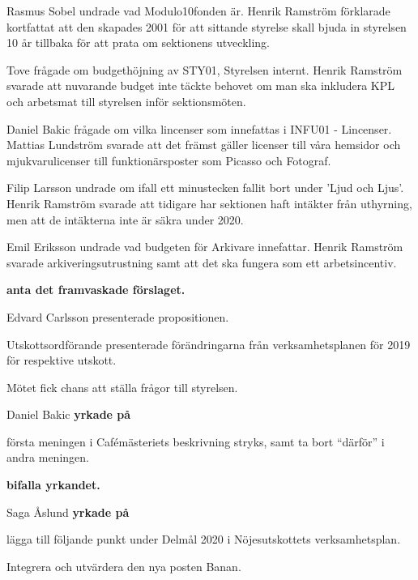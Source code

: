 \documentclass[10pt]{article}
\begin{document}
\begin{paragrafer}
\begin{paragrafer}
      Rasmus Sobel undrade vad Modulo10fonden är. Henrik Ramström förklarade kortfattat att den skapades 2001 för att sittande styrelse skall bjuda in styrelsen 10 år tillbaka för att prata om sektionens utveckling. 


      Tove frågade om budgethöjning av STY01, Styrelsen internt. Henrik Ramström svarade att nuvarande budget inte täckte behovet om man ska inkludera KPL och arbetsmat till styrelsen inför sektionsmöten. 

      Daniel Bakic frågade om vilka lincenser som innefattas i INFU01 - Lincenser. Mattias Lundström svarade att det främst gäller licenser till våra hemsidor och mjukvarulicenser till funktionärsposter som Picasso och Fotograf. 
      
      Filip Larsson undrade om ifall ett minustecken fallit bort under 'Ljud och Ljus'. Henrik Ramström svarade att tidigare har sektionen haft intäkter från uthyrning, men att de intäkterna inte är säkra under 2020. 

      Emil Eriksson undrade vad budgeten för Arkivare innefattar. Henrik Ramström svarade arkiveringsutrustning samt att det ska fungera som ett arbetsincentiv. 

      \textbf{\Mba anta det framvaskade förslaget.}



      Edvard Carlsson presenterade propositionen. 

      Utskottsordförande presenterade förändringarna från verksamhetsplanen för 2019 för respektive utskott.

      Mötet fick chans att ställa frågor till styrelsen. 

      Daniel Bakic \textbf{yrkade på}
      \begin{attsatser}
        \att första meningen i Cafémästeriets beskrivning stryks, samt
        \att ta bort ``därför'' i andra meningen.
      \end{attsatser}

      \textbf{\Mba bifalla yrkandet.}

      Saga Åslund \textbf{yrkade på} 
      \begin{attsatser}
        \att lägga till följande punkt under Delmål 2020 i Nöjesutskottets verksamhetsplan.
            \begin{dashlist}
                \item Integrera och utvärdera den nya posten Banan. 
            \end{dashlist}
      \end{attsatser}


\end{paragrafer}
\end{paragrafer}
\end{document}

